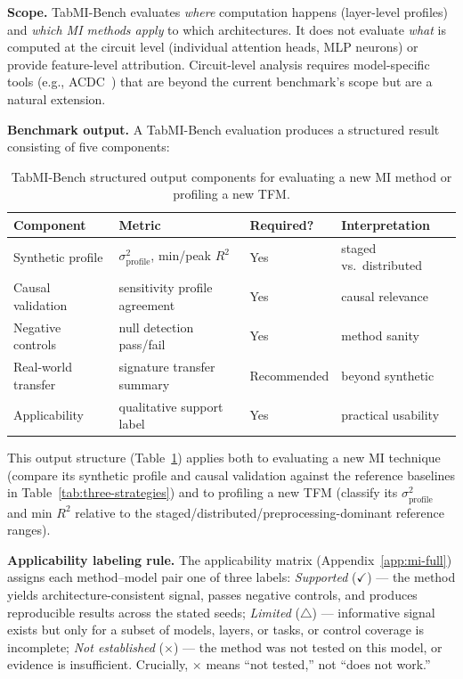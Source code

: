 \documentclass{article}
\begin{document}
\textbf{Scope.} TabMI-Bench evaluates \textit{where} computation happens (layer-level profiles) and \textit{which MI methods apply} to which architectures. It does not evaluate \textit{what} is computed at the circuit level (individual attention heads, MLP neurons) or provide feature-level attribution. Circuit-level analysis requires model-specific tools (e.g., ACDC~\cite{conmy2023acdc}) that are beyond the current benchmark's scope but are a natural extension.

\textbf{Benchmark output.} A TabMI-Bench evaluation produces a structured result consisting of five components:

\begin{table}[t]
\centering
\caption{TabMI-Bench structured output components for evaluating a new MI method or profiling a new TFM.}
\label{tab:benchmark-output}
\small
\begin{tabular}{@{}l l l l@{}}
\toprule
Component & Metric & Required? & Interpretation \\
\midrule
Synthetic profile & $\sigma^2_\text{profile}$, min/peak $R^2$ & Yes & staged vs.\ distributed \\
Causal validation & sensitivity profile agreement & Yes & causal relevance \\
Negative controls & null detection pass/fail & Yes & method sanity \\
Real-world transfer & signature transfer summary & Recommended & beyond synthetic \\
Applicability & qualitative support label & Yes & practical usability \\
\bottomrule
\end{tabular}
\end{table}

\noindent This output structure (Table~\ref{tab:benchmark-output}) applies both to evaluating a new MI technique (compare its synthetic profile and causal validation against the reference baselines in Table~\ref{tab:three-strategies}) and to profiling a new TFM (classify its $\sigma^2_\text{profile}$ and min $R^2$ relative to the staged/distributed/preprocessing-dominant reference ranges).

\textbf{Applicability labeling rule.} The applicability matrix (Appendix~\ref{app:mi-full}) assigns each method--model pair one of three labels: \textit{Supported} ($\checkmark$) --- the method yields architecture-consistent signal, passes negative controls, and produces reproducible results across the stated seeds; \textit{Limited} ($\triangle$) --- informative signal exists but only for a subset of models, layers, or tasks, or control coverage is incomplete; \textit{Not established} ($\times$) --- the method was not tested on this model, or evidence is insufficient. Crucially, $\times$ means ``not tested,'' not ``does not work.''
\end{document}
